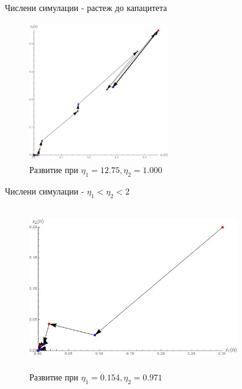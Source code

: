 \begin{frame}[t]{Числени симулации - растеж до капацитета}

\begin{center}
\begin{figure}[htp]
\includegraphics[width=6cm,height=6cm]
{migrationSimulation3}
\caption{Развитие при $\eta_{1}=12.75, \eta_{2}=1.000$}
\end{figure}
\end{center}

\end{frame}

\begin{frame}[t]{Числени симулации - $\eta_{1} < \eta_{2} < 2$}

\begin{center}
\begin{figure}[htp]
\includegraphics[width=9cm,height=7cm]
{migrationSimulation4}
\caption{Развитие при $\eta_{1}=0.154, \eta_{2}=0.971$}
\end{figure}
\end{center}

\end{frame}
